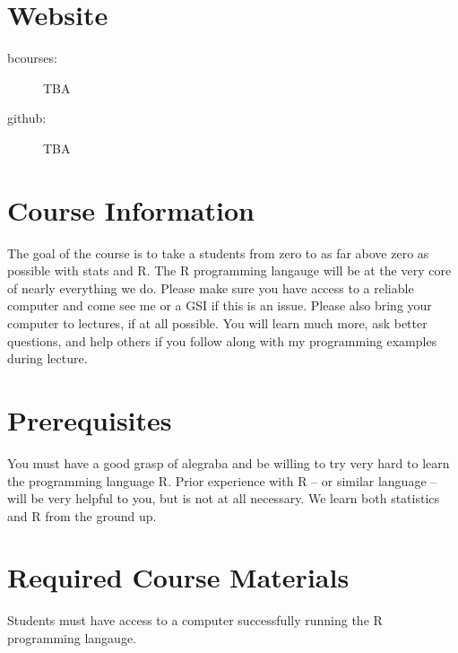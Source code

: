 \documentclass{article}
\begin{document}
\section{Website}
\begin{description}
\item[bcourses:] TBA
\item[github:] TBA
\end{description}

\section{Course Information}
The goal of the course is to take a students from zero to as far above zero as
possible with stats and R. The R programming langauge will be at the very core
of nearly everything we do. Please make sure you have access to a reliable
computer and come see me or a GSI if this is an issue. Please also bring your
computer to lectures, if at all possible. You will learn much more, ask better
questions, and help others if you follow along with my programming examples
during lecture.


\section{Prerequisites}
You must have a good grasp of alegraba and be willing to try very hard to learn
the programming language R. Prior experience with R -- or similar language --
will be very helpful to you, but is not at all necessary. We learn both
statistics and R from the ground up.

\section{Required Course Materials}
Students must have access to a computer successfully running the R programming
langauge.
\end{document}
